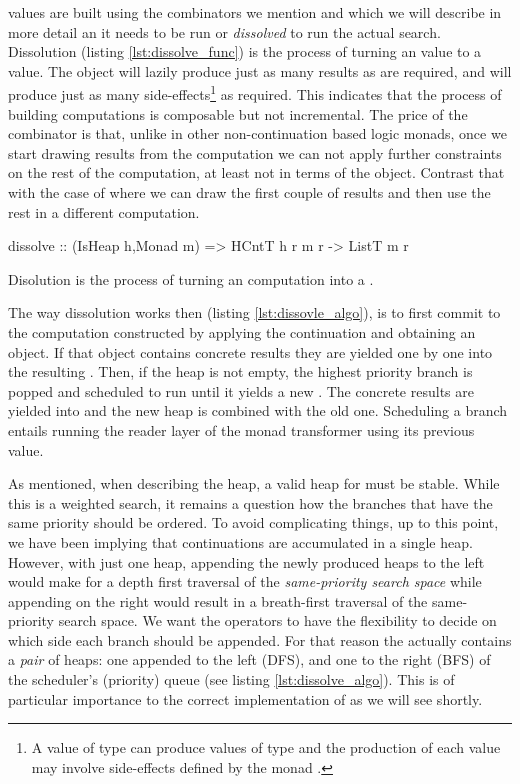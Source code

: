  values are built using the combinators we mention and which we will 
describe in more detail an it needs to be run or \emph{dissolved} to run the actual
search. Dissolution (listing \ref{lst:dissolve_func}) is the process
of turning an  value to a  value. The
 object will lazily produce just as many results as are
required, and will produce just as many side-effects\footnote{A value of type  can produce values of type  and the production of each value may involve side-effects defined by the monad .} as required. 
This indicates that the process of building computations is
composable but not incremental. The price of the \hask{<//>}
combinator is that, unlike in other non-continuation
based logic  monads, once we start drawing results from the computation we can
not apply further constraints on the rest of the computation, at least not
in terms of the  object.  Contrast that with the case of
 where we can draw the first couple of results and then
use the rest in a different computation.

\begin{code}
\begin{haskellcode}
dissolve :: (IsHeap h,Monad m) => HCntT h r m r -> ListT m r
\end{haskellcode}
  \caption{\label{lst:dissolve_func}Disolution is the process of
    turning an  computation into a .}
\end{code}

The way dissolution works then (listing \ref{lst:dissovle_algo}), is to first
commit to the computation constructed by applying the continuation and
obtaining an  object. If that object contains concrete results they are
yielded one by one into the resulting .
Then, if the heap is not empty, the highest priority branch is popped and scheduled to run until it yields
a new . The concrete results are yielded into  and the
new heap is combined with the old one. Scheduling a branch entails
running the reader layer of the monad transformer using its previous
value.

As mentioned, when describing the heap, a valid heap for 
must be stable. While this is a weighted search, it remains a question
how the branches that have the same priority should be ordered.  To
avoid complicating things, up to this point, we have been implying that
continuations are accumulated in a single heap. However, with just one
heap, appending the newly produced heaps to the left would make for a
depth first traversal of the \emph{same-priority search space} while
appending on the right would result in a breath-first traversal of the same-priority search space. We
want the operators to have the flexibility to decide on which side
each branch should be appended. For that reason the 
actually contains a \emph{pair} of heaps: one appended to the left (DFS), and one
to the right (BFS) of the scheduler's (priority) queue (see listing \ref{lst:dissolve_algo}).
This is of particular importance to the correct
implementation of \hask{<//>} as we will see shortly.

